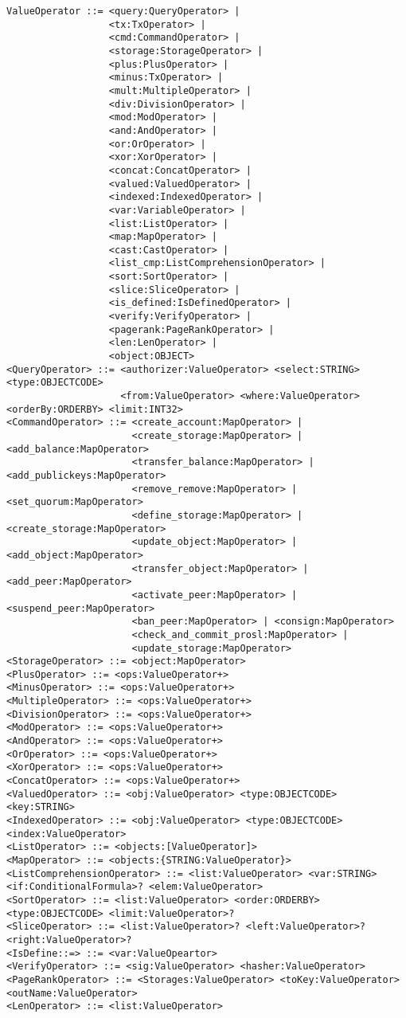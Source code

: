 \begin{verbatim}
ValueOperator ::= <query:QueryOperator> |
                  <tx:TxOperator> |
                  <cmd:CommandOperator> |
                  <storage:StorageOperator> |
                  <plus:PlusOperator> |
                  <minus:TxOperator> |
                  <mult:MultipleOperator> |
                  <div:DivisionOperator> |
                  <mod:ModOperator> |
                  <and:AndOperator> |
                  <or:OrOperator> |
                  <xor:XorOperator> |
                  <concat:ConcatOperator> |
                  <valued:ValuedOperator> |
                  <indexed:IndexedOperator> |
                  <var:VariableOperator> |
                  <list:ListOperator> |
                  <map:MapOperator> |
                  <cast:CastOperator> |
                  <list_cmp:ListComprehensionOperator> |
                  <sort:SortOperator> |
                  <slice:SliceOperator> |
                  <is_defined:IsDefinedOperator> |
                  <verify:VerifyOperator> |
                  <pagerank:PageRankOperator> |
                  <len:LenOperator> |
                  <object:OBJECT>
<QueryOperator> ::= <authorizer:ValueOperator> <select:STRING> <type:OBJECTCODE>
                    <from:ValueOperator> <where:ValueOperator> <orderBy:ORDERBY> <limit:INT32>
<CommandOperator> ::= <create_account:MapOperator> |
                      <create_storage:MapOperator> | <add_balance:MapOperator>
                      <transfer_balance:MapOperator> | <add_publickeys:MapOperator>
                      <remove_remove:MapOperator> | <set_quorum:MapOperator>
                      <define_storage:MapOperator> | <create_storage:MapOperator>
                      <update_object:MapOperator> | <add_object:MapOperator>
                      <transfer_object:MapOperator> | <add_peer:MapOperator>
                      <activate_peer:MapOperator> | <suspend_peer:MapOperator>
                      <ban_peer:MapOperator> | <consign:MapOperator>
                      <check_and_commit_prosl:MapOperator> |
                      <update_storage:MapOperator>
<StorageOperator> ::= <object:MapOperator>
<PlusOperator> ::= <ops:ValueOperator+>
<MinusOperator> ::= <ops:ValueOperator+>
<MultipleOperator> ::= <ops:ValueOperator+>
<DivisionOperator> ::= <ops:ValueOperator+>
<ModOperator> ::= <ops:ValueOperator+>
<AndOperator> ::= <ops:ValueOperator+>
<OrOperator> ::= <ops:ValueOperator+>
<XorOperator> ::= <ops:ValueOperator+>
<ConcatOperator> ::= <ops:ValueOperator+>
<ValuedOperator> ::= <obj:ValueOperator> <type:OBJECTCODE> <key:STRING>
<IndexedOperator> ::= <obj:ValueOperator> <type:OBJECTCODE> <index:ValueOperator>
<ListOperator> ::= <objects:[ValueOperator]>
<MapOperator> ::= <objects:{STRING:ValueOperator}>
<ListComprehensionOperator> ::= <list:ValueOperator> <var:STRING> <if:ConditionalFormula>? <elem:ValueOperator>
<SortOperator> ::= <list:ValueOperator> <order:ORDERBY> <type:OBJECTCODE> <limit:ValueOperator>?
<SliceOperator> ::= <list:ValueOperator>? <left:ValueOperator>? <right:ValueOperator>?
<IsDefine::=> ::= <var:ValueOpeartor>
<VerifyOperator> ::= <sig:ValueOperator> <hasher:ValueOperator>
<PageRankOperator> ::= <Storages:ValueOperator> <toKey:ValueOperator> <outName:ValueOperator>
<LenOperator> ::= <list:ValueOperator>


\end{verbatim}
